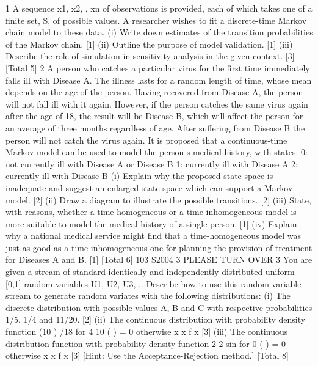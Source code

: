 
1 A sequence x1, x2, , xn of observations is provided, each of which takes one of a
finite set, S, of possible values. A researcher wishes to fit a discrete-time Markov
chain model to these data.
(i) Write down estimates of the transition probabilities of the Markov chain. [1]
(ii) Outline the purpose of model validation. [1]
(iii) Describe the role of simulation in sensitivity analysis in the given context. [3]
[Total 5]
2 A person who catches a particular virus for the first time immediately falls ill with
Disease A. The illness lasts for a random length of time, whose mean depends on the
age of the person. Having recovered from Disease A, the person will not fall ill with it
again. However, if the person catches the same virus again after the age of 18, the
result will be Disease B, which will affect the person for an average of three months
regardless of age. After suffering from Disease B the person will not catch the virus
again.
It is proposed that a continuous-time Markov model can be used to model the person s
medical history, with states:
0: not currently ill with Disease A or Disease B
1: currently ill with Disease A
2: currently ill with Disease B
(i) Explain why the proposed state space is inadequate and suggest an enlarged
state space which can support a Markov model. [2]
(ii) Draw a diagram to illustrate the possible transitions. [2]
(iii) State, with reasons, whether a time-homogeneous or a time-inhomogeneous
model is more suitable to model the medical history of a single person. [1]
(iv) Explain why a national medical service might find that a time-homogeneous
model was just as good as a time-inhomogeneous one for planning the
provision of treatment for Diseases A and B. [1]
[Total 6]
103 S2004 3 PLEASE TURN OVER
3 You are given a stream of standard identically and independently distributed uniform
[0,1] random variables U1, U2, U3, ..
Describe how to use this random variable stream to generate random variates with the
following distributions:
(i) The discrete distribution with possible values A, B and C with respective
probabilities 1/5, 1/4 and 11/20. [2]
(ii) The continuous distribution with probability density function
(10 ) /18 for 4 10
( ) =
0 otherwise
x x
f x [3]
(iii) The continuous distribution function with probability density function
2 2
sin for 0
( ) =
0 otherwise
x x
f x [3]
[Hint: Use the Acceptance-Rejection method.]
[Total 8]


